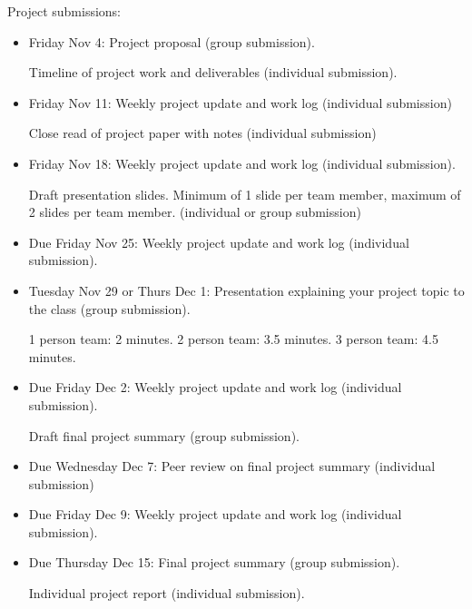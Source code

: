 \documentclass[12pt,letterpaper,noanswers]{exam}
\begin{document}
\eject 
\noindent Project submissions:
\begin{itemize}
    \item Friday Nov 4: Project proposal (group submission).  
    
    Timeline of project work and deliverables (individual submission).
    \item Friday Nov 11: Weekly project update and work log (individual submission)
    
    Close read of project paper with notes (individual submission)

    \item Friday Nov 18: Weekly project update and work log (individual submission).  
    
    Draft presentation slides.  Minimum of 1 slide per team member, maximum of 2 slides per team member.  (individual or group submission)
    \item Due Friday Nov 25: Weekly project update and work log (individual submission).  
    \item Tuesday Nov 29 or Thurs Dec 1: Presentation explaining your project topic to the class (group submission).  
    
    1 person team: 2 minutes.  2 person team: 3.5 minutes.  3 person team: 4.5 minutes.
    \item Due Friday Dec 2: Weekly project update and work log (individual submission).  
    
    Draft final project summary (group submission).
    \item Due Wednesday Dec 7: Peer review on final project summary (individual submission)
    \item Due Friday Dec 9: Weekly project update and work log (individual submission).
    \item Due Thursday Dec 15: Final project summary (group submission).  
    
    Individual project report (individual submission).
\end{itemize}
\end{document}
